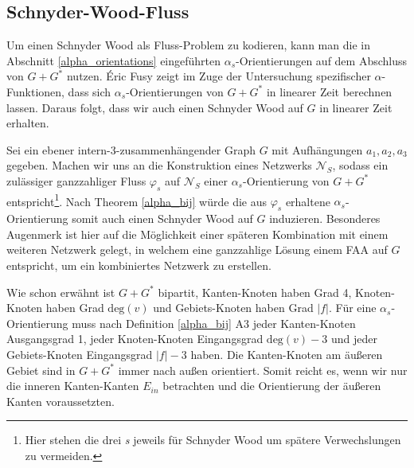 \subsection{Schnyder-Wood-Fluss}

Um einen Schnyder Wood als Fluss-Problem zu kodieren, kann man die in Abschnitt \ref{alpha_orientations} eingeführten $\alpha_s$-Orientierungen auf dem Abschluss von $G+G^*$ nutzen. \'Eric Fusy zeigt im Zuge der Untersuchung spezifischer $\alpha$-Funktionen, dass sich $\alpha_s$-Orientierungen von $G+G^*$ in linearer Zeit berechnen lassen\cite{fusy07}. Daraus folgt, dass wir auch einen Schnyder Wood auf $G$ in linearer Zeit erhalten. 

Sei ein ebener intern-3-zusammenhängender Graph $G$ mit Aufhängungen $a_1,a_2,a_3$ gegeben. Machen wir uns an die Konstruktion eines Netzwerks $\mathcal{N}_S$, sodass ein zulässiger ganzzahliger Fluss $\varphi_s$ auf $\mathcal{N}_S$ einer $\alpha_s$-Orientierung von $G+G^*$ entspricht\footnote{Hier stehen die drei \textit{s} jeweils für Schnyder Wood um spätere Verwechslungen zu vermeiden.}. Nach Theorem \ref{alpha_bij} würde die aus $\varphi_s$ erhaltene $\alpha_s$-Orientierung somit auch einen Schnyder Wood auf $G$ induzieren. Besonderes Augenmerk ist hier auf die Möglichkeit einer späteren Kombination mit einem weiteren Netzwerk gelegt, in welchem eine ganzzahlige Lösung einem FAA auf $G$ entspricht, um ein kombiniertes Netzwerk zu erstellen.

Wie schon erwähnt ist $G+G^*$ bipartit, Kanten-Knoten haben Grad 4, Knoten-Knoten haben Grad $\text{deg}(v)$ und Gebiets-Knoten haben Grad $|f|$. Für eine $\alpha_s$-Orien\-tier\-ung muss nach Definition \ref{alpha_bij} A3 jeder Kanten-Knoten Ausgangsgrad 1, jeder Knoten-Knoten Eingangsgrad $\text{deg}(v)-3$ und jeder Gebiets-Knoten Eingangsgrad $|f|-3$ haben. Die Kanten-Knoten am äußeren Gebiet sind in $G+G^*$ immer nach außen orientiert. Somit reicht es, wenn wir nur die inneren Kanten-Kanten $E_{in}$ betrachten und die Orientierung der äußeren Kanten voraussetzten.

